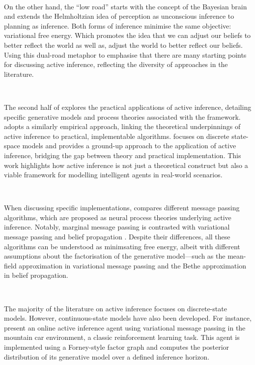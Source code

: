\documentclass{article}
\begin{document}
\

On the other hand, the ``low road'' starts with the concept of the Bayesian brain and extends the Helmholtzian idea of perception as unconscious inference to planning as inference. Both forms of inference minimise the same objective: variational free energy. \citet{parr2022ActiveInference} Which promotes the idea that we can adjust our beliefs to better reflect the world as well as, adjust the world to better reflect our beliefs. Using this dual-road metaphor to emphasise that there are many starting points for discussing active inference, reflecting the diversity of approaches in the literature.

\

The second half of \citet{parr2022ActiveInference} explores the practical applications of active inference, detailing specific generative models and process theories associated with the framework. \citet{smith2022} adopts a similarly empirical approach, linking the theoretical underpinnings of active inference to practical, implementable algorithms. \citet{dacosta2020active} focuses on discrete state-space models and provides a ground-up approach to the application of active inference, bridging the gap between theory and practical implementation. This work highlights how active inference is not just a theoretical construct but also a viable framework for modelling intelligent agents in real-world scenarios.

\

When discussing specific implementations, \citet{parr2019neuronal} compares different message passing algorithms, which are proposed as neural process theories underlying active inference. Notably, marginal message passing is contrasted with variational message passing \citep{winn2005variational} and belief propagation \citep{pearl1986prop}. Despite their differences, all these algorithms can be understood as minimsating free energy, albeit with different assumptions about the factorisation of the generative model—such as the mean-field approximation in variational message passing and the Bethe approximation in belief propagation.

\

The majority of the literature on active inference focuses on discrete-state models. However, continuous-state models have also been developed. For instance, \citet{van2019simulating} present an online active inference agent using variational message passing in the mountain car environment, a classic reinforcement learning task. This agent is implemented using a Forney-style factor graph and computes the posterior distribution of its generative model over a defined inference horizon.
\end{document}
